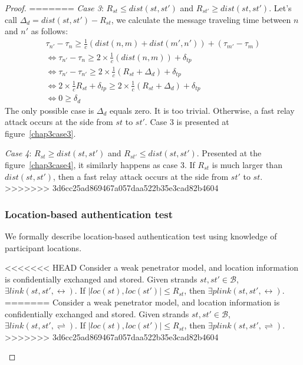 \begin{flushleft}
\begin{flushleft}
\begin{Definition}
\begin{itemize}
\begin{Definition}
\begin{proof}
=======
\emph{Case 3}: $R_{st} \le dist(st,st')$ and $R_{st'} \ge dist(st,st')$. Let's call $\Delta_d = dist(st,st') - R_{st}$, we calculate the message traveling time between $n$ and $n'$ as follows: 
\begin{equation*}
\begin{split}
		\tau_{n'} - \tau_{n} \ge \frac 1 {c}(dist(n,m) + dist(m', n')) + (\tau_{m'} - \tau_{m}) \\ \Leftrightarrow
		\tau_{n'} - \tau_{n} \ge 2 \times \frac 1 {c}(dist(n,m)) + \delta_{tp}\\ \Leftrightarrow
		\tau_{n'} - \tau_{n'} \ge 2 \times \frac 1 {c} (R_{st} + \Delta_d) + \delta_{tp} \\ \Leftrightarrow
		2 \times \frac 1 {c} R_{st} + \delta_{tp} \ge 2 \times \frac 1 {c} (R_{st} + \Delta_d ) + \delta_{tp} \\ \Leftrightarrow
		0 \ge \delta_{d} 
\end{split}
\end{equation*}
The only possible case is $\Delta_{d}$ equals zero. It is too trivial. Otherwise, a fast relay attack occurs at the side from $st$ to $st'$. Case 3 is presented at figure~\ref{chap3case3}.

\emph{Case 4}: $R_{st} \ge dist(st,st')$ and $R_{st'} \le dist(st,st')$. Presented at the figure~\ref{chap3case4}, it similarly happens as case 3. If $R_{st}$ is much larger than $dist(st,st')$, then a fast relay attack occurs at the side from $st'$ to $st$. 
>>>>>>> 3d6cc25ad869467a057daa522b35e3cad82b4604
\subsubsection*{Location-based authentication test}

We formally describe location-based authentication test using knowledge of participant locations. 

\begin{Proposition}
<<<<<<< HEAD
Consider a weak penetrator model, and location information is confidentially exchanged and stored. Given strands $st, st' \in \mathcal{B}$, $\exists link(st,st', \leftrightarrow)$. If $|loc(st),loc(st')| \le R_{st}$, then $\exists plink(st, st',\leftrightarrow)$. 
=======
Consider a weak penetrator model, and location information is confidentially exchanged and stored. Given strands $st, st' \in \mathcal{B}$, $\exists link(st,st', \rightleftharpoons)$. If $|loc(st),loc(st')| \le R_{st}$, then $\exists plink(st, st',\rightleftharpoons)$. 
>>>>>>> 3d6cc25ad869467a057daa522b35e3cad82b4604
\end{Proposition}


\end{proof}
\end{Definition}
\end{itemize}
\end{Definition}
\end{flushleft}
\end{flushleft}
